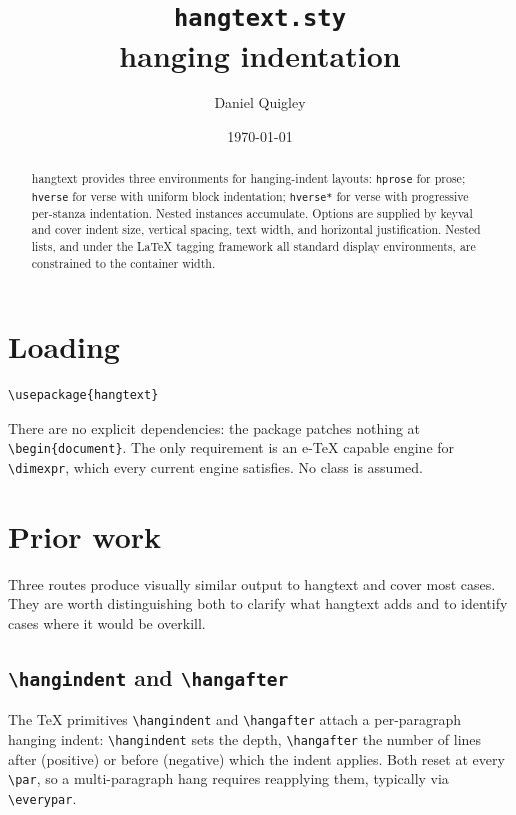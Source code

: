 \documentclass[11pt, twoside, openany]{article}
\title{\texttt{hangtext.sty}\\[0.5\baselineskip]
  \large hanging indentation}
\author{Daniel Quigley}
\date{\today}
\newcommand{\pkg}[1]{\textsf{#1}}
\newcommand{\env}[1]{\texttt{#1}}
\newcommand{\cs}[1]{\texttt{\textbackslash #1}}
\begin{document}
\maketitle

\begin{abstract}
\pkg{hangtext} provides three environments for hanging-indent layouts: \env{hprose} for prose; \env{hverse} for verse with uniform block indentation; \env{hverse*} for verse with progressive per-stanza indentation. Nested instances accumulate. Options are supplied by keyval and cover indent size, vertical spacing, text width, and horizontal justification. Nested lists, and under the \LaTeX{} tagging framework all standard display environments, are constrained to the container width.
\end{abstract}

\tableofcontents


\section{Loading}

\begin{verbatim}
\usepackage{hangtext}
\end{verbatim}

There are no explicit dependencies: the package patches nothing at \cs{begin\{document\}}. The only requirement is an e-\TeX{} capable engine for \cs{dimexpr}, which every current engine satisfies. No class is assumed.

\section{Prior work}\label{sec:priorart}

Three routes produce visually similar output to \pkg{hangtext} and cover most cases. They are worth distinguishing both to clarify what \pkg{hangtext} adds and to identify cases where it would be overkill.

\subsection{\cs{hangindent} and \cs{hangafter}}

The \TeX{} primitives \cs{hangindent} and \cs{hangafter} attach a per-paragraph hanging indent: \cs{hangindent} sets the depth, \cs{hangafter} the number of lines after (positive) or before (negative) which the indent applies. Both reset at every \cs{par}, so a multi-paragraph hang requires reapplying them, typically via \cs{everypar}.
\end{document}
